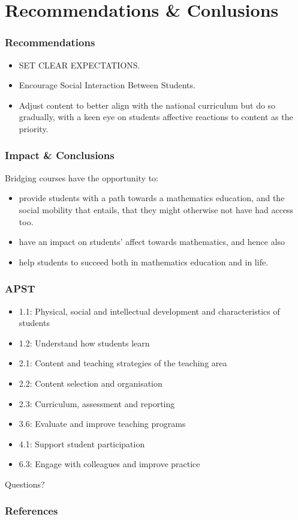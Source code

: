 \documentclass[14pt]{beamer}
\begin{document}
\section{Recommendations \& Conlusions}

\begin{frame}
\frametitle{Recommendations}
\begin{itemize}
	\item SET CLEAR EXPECTATIONS.
	\item Encourage Social Interaction Between Students.
	\item Adjust content to better align with the national curriculum but do so gradually, with a keen eye on students affective reactions to content as the priority.
\end{itemize}
\end{frame}

\begin{frame}
\frametitle{Impact \& Conclusions}
Bridging courses have the opportunity to:
\begin{itemize}
	\item provide students with a path towards a mathematics education, and the social mobility that entails, that they might otherwise not have had access too.
	\item have an impact on students' affect towards mathematics, and hence also
	\item help students to succeed both in mathematics education and in life.
\end{itemize}
\end{frame}

\begin{frame}
\frametitle{APST}
\begin{itemize}
	\item 1.1: Physical, social and intellectual development and characteristics of students
	\item 1.2: Understand how students learn
	\item 2.1: Content and teaching strategies of the teaching area
	\item 2.2: Content selection and organisation
	\item 2.3: Curriculum, assessment and reporting
	\item 3.6: Evaluate and improve teaching programs
	\item 4.1: Support student participation
	\item 6.3: Engage with colleagues and improve practice
\end{itemize}
\end{frame}


\begin{frame}
\begin{center}
{\Huge
Questions?
}
\end{center}
\end{frame}

\begin{frame}[allowframebreaks]
    \frametitle{References}
	
	 
\end{frame}
\end{document}
